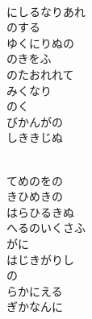 \documentclass[10pt,b5j]{tarticle} %
\begin{document}
\begin{enumerate}
\begin{minipage}[c]{\blocksize}
    \end{minipage}
    \begin{minipage}[c]{\blocksize}
        
        \vspace{\linespace}
        \item~\\
        にしるなりあれ\\
        のする\\
        ゆくにりぬの\\
        のきをふ\\
        のたおれれて\\
        みくなり\\
        のく\\
        びかんがの\\
        しききじぬ
        
    \end{minipage}
    \begin{minipage}[c]{\blocksize}
        
        \vspace{\linespace}
        \item~\\
        てめのをの\\
        きひめきの\\
        はらひるきぬ\\
        へるのいくさふ\\
        がに\\
        はじきがりし\\
        の\\
        らかにえる\\
        ぎかなんに
    
    \end{minipage}
\end{enumerate} %
\end{document}
